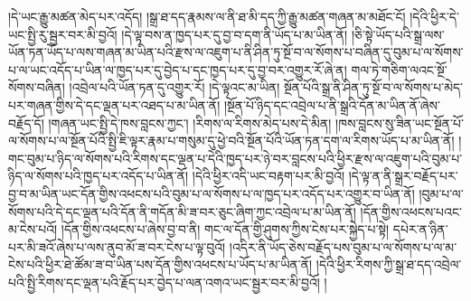 །དེ་ཡང་རྒྱུ་མཚན་མེད་པར་འདོད། །སྒྲ་ཐ་དད་རྣམས་ལ་ནི་ཐ་མི་དད་ཀྱི་རྒྱུ་མཚན་གཞན་མ་མཐོང་ངོ། །དེའི་ཕྱིར་དེ་ཡང་སྤྱི་རུ་སྦྱར་བར་མི་བྱའོ། །དེ་ལྟ་བས་ན་ཁྱད་པར་དུ་བྱ་བ་དག་ནི་ཡོད་པ་མ་ཡིན་ནོ། །ཅི་སྟེ་ཡོད་པའི་སྒྲ་ལས་ཡོན་ཏན་ཡོད་པ་ལས་གཞན་མ་ཡིན་པའི་རྫས་ལ་འཇུག་པ་ནི་ཤིན་ཏུ་སྔོ་བ་ལ་སོགས་པ་བཞིན་དུ་བུམ་པ་ལ་སོགས་པ་ལ་ཡང་འདོད་པ་ཡིན་ལ་ཁྱད་པར་དུ་བྱེད་པ་དང་ཁྱད་པར་དུ་བྱ་བར་འགྱུར་རོ་ཞེ་ན། གལ་ཏེ་གཅིག་ལའང་སྔོ་སོགས་བཞིན། །འབྲེལ་པའི་ཡོན་ཏན་དུ་འགྱུར་རོ། །དེ་ལྟའང་མ་ཡིན། སྔོན་པོའི་སྒྲ་ནི་ཤིན་ཏུ་སྔོ་བ་ལ་སོགས་པ་མེད་པར་གཞན་གྱིས་དེ་དང་ལྡན་པར་འཐད་པ་མ་ཡིན་ནོ། །སྔོན་པོ་ཉིད་དང་འབྲེལ་པ་ནི་སྒྲའི་དོན་མ་ཡིན་ནོ་ཞེས་བརྗོད་དོ། །གཞན་ཡང་སྤྱི་དེ་ཁས་བླངས་ཀྱང་། །རིགས་ལ་རིགས་མེད་པས་དེ་མིན། །ཁས་བླངས་སུ་ཟིན་ཡང་སྔོན་པོ་ལ་སོགས་པ་ལ་སྔོན་པོའི་སྤྱི་ཇི་ལྟར་རྣམ་པ་གསུམ་དུ་ཕྱེ་བའི་སྔོན་པོའི་ཡོན་ཏན་དག་ལ་རིགས་ཡོད་པ་མ་ཡིན་ནོ། །གང་བུམ་པ་ཉིད་ལ་སོགས་པའི་རིགས་དང་ལྡན་པ་དེའི་ཁྱད་པར་ཉེ་བར་བླངས་པའི་ཕྱིར་རྫས་ལ་འཇུག་པའི་བུམ་པ་ཉིད་ལ་སོགས་པའི་ཁྱད་པར་འདོད་པ་ཡིན་ནོ། །དེའི་ཕྱིར་འདི་ཡང་བརྟག་པར་མི་བྱའོ། །དེ་ལྟ་ན་ནི་སྒྲར་བརྗོད་པར་བྱ་བ་མ་ཡིན་ཡང་དོན་གྱིས་འཕངས་པའི་བུམ་པ་ལ་སོགས་པ་ལ་ཁྱད་པར་འདོད་པར་འགྱུར་བ་ཡིན་ནོ། །བུམ་པ་ལ་སོགས་པའི་དེ་དང་ལྡན་པའི་དོན་ནི་གདོན་མི་ཟ་བར་ཅུང་ཞིག་ཀྱང་འབྲེལ་པ་མ་ཡིན་ནོ། །དོན་གྱིས་འཕངས་པའང་མ་ངེས་པའོ། །དོན་གྱིས་འཕངས་པ་ཞེས་བྱ་བ་ནི། གང་ལ་དོན་གྱི་ཤུགས་ཀྱིས་ངེས་པར་སྐྱེད་པ་སྟེ། དཔེར་ན་ཉིན་པར་མི་ཟའོ་ཞེས་པ་ལས་ནུབ་མོ་ཟ་བར་ངེས་པ་ལྟ་བུའོ། །འདིར་ནི་ཡོད་ཅེས་བརྗོད་པས་བུམ་པ་ལ་སོགས་པ་ལ་མ་ངེས་པའི་ཕྱིར་ཐེ་ཚོམ་ཟ་བ་ཡིན་པས་དོན་གྱིས་འཕངས་པ་ཡོད་པ་མ་ཡིན་ནོ། །དེའི་ཕྱིར་རིགས་ཀྱི་སྒྲ་ཐ་དད་འབྲེལ་པའི་སྤྱི་རིགས་དང་ལྡན་པའི་རྗོད་པར་བྱེད་པ་ལན་འགའ་ཡང་སྦྱར་བར་མི་བྱའོ། །
